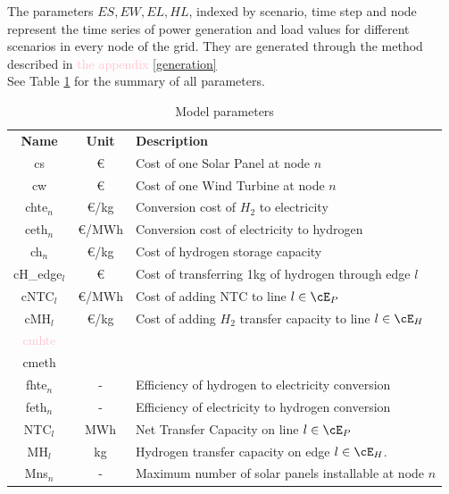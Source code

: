\indent The parameters $ES, EW, EL, HL$, indexed by scenario, time step and node represent the time series of power generation and load values for different scenarios in every node of the grid. They are generated through the method described in \textcolor{pink}{the appendix \ref{generation}}\\

\indent See Table \ref{table_param} for the summary of all parameters. 

\begin{table}
\caption{Model parameters}
  \label{table_param}       %
\begin{tabularx}{\textwidth}{ccl}
  \hline\noalign{\smallskip}
    \textbf{Name} & \textbf{Unit} & \textbf{Description}  \\
  \noalign{\smallskip}\hline\noalign{\smallskip}
    cs & \euro& Cost of one Solar Panel at node $n$\\
    cw & \euro & Cost of one Wind Turbine at node $n$\\
    chte$_n$ & \euro/kg & Conversion cost of \textcolor{Cerulean}{$H_2$} to electricity \\
    ceth$_n$ & \euro/MWh & Conversion cost of electricity to hydrogen \\
    ch$_n$ & \euro/kg & Cost of hydrogen storage capacity\\
    cH\_edge$_l$ & \euro & Cost of transferring 1kg of hydrogen through edge $l$\\
    cNTC$_l$ & \euro/MWh & Cost of adding NTC to line $l\in\cE_P$\\
    cMH$_l$ &\euro/kg& Cost of adding $H_2$ transfer capacity to line $l\in\cE_H$\\
    \textcolor{pink}{cmhte} &&\\
    cmeth &&\\
  \noalign{\smallskip}\hline\noalign{\smallskip}
    fhte$_n$ & - & Efficiency of hydrogen to electricity conversion \\ 
    feth$_n$ & - & Efficiency of electricity to hydrogen conversion \\
    NTC$_l$ & MWh & Net Transfer Capacity on line $l\in\cE_P$\\
    MH$_l$ & kg &  Hydrogen transfer capacity on edge \textcolor{Cerulean}{$l\in\cE_H$}.\\
  \noalign{\smallskip}\hline\noalign{\smallskip}
    Mns$_n$ & - & Maximum number of solar panels installable at node $n$\\ 

\end{tabularx}
\end{table}
